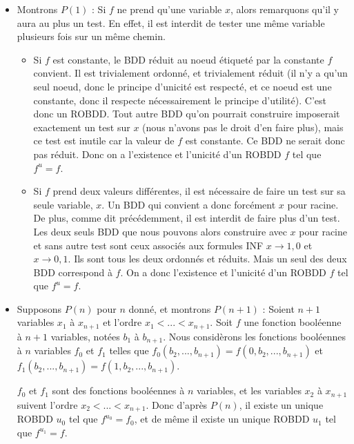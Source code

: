 \documentclass[a4paper,11pt]{article}
\begin{document}
		\begin{itemize}
		\item Montrons $P(1)$ : \newline
		Si $f$ ne prend qu'une variable $x$, alors remarquons qu'il y aura au plus un test. En effet, il est interdit de tester une même variable plusieurs fois sur un même chemin.
		\begin{itemize}
		\item Si $f$ est constante, le BDD réduit au noeud étiqueté par la constante $f$ convient. Il est trivialement ordonné, et trivialement réduit (il n'y a qu'un seul noeud, donc le principe d'unicité est respecté, et ce noeud est une constante, donc il respecte nécessairement le principe d'utilité). C'est donc un ROBDD. Tout autre BDD qu'on pourrait construire imposerait exactement un test sur $x$ (nous n'avons pas le droit d'en faire plus), mais ce test est inutile car la valeur de $f$ est constante. Ce BDD ne serait donc pas réduit. Donc on a l'existence et l'unicité d'un ROBDD $f$ tel que $f^u = f$.
		\item Si $f$ prend deux valeurs différentes, il est nécessaire de faire un test sur sa seule variable, $x$. Un BDD qui convient a donc forcément $x$ pour racine. De plus, comme dit précédemment, il est interdit de faire plus d'un test. Les deux seuls BDD que nous pouvons alors construire avec $x$ pour racine et sans autre test sont ceux associés aux formules INF $x \rightarrow 1,0$ et $x \rightarrow 0,1$. Ils sont tous les deux ordonnés et réduits. Mais un seul des deux BDD correspond à $f$. On a donc l'existence et l'unicité d'un ROBDD $f$ tel que $f^u = f$.
		\end{itemize}
		\item Supposons $P(n)$ pour $n$ donné, et montrons $P(n+1)$ :
		Soient $n+1$ variables $x_1$ à $x_{n+1}$ et l'ordre $x_1 < ... < x_{n+1}$.
		Soit $f$ une fonction booléenne à $n+1$ variables, notées $b_1$ à $b_{n+1}$. Nous considèrons les fonctions booléennes à $n$ variables $f_0$ et $f_1$ telles que $f_0(b_2,...,b_{n+1}) = f(0,b_2,...,b_{n+1})$ et $f_1(b_2,...,b_{n+1}) = f(1,b_2,...,b_{n+1})$.\newline
		
		$f_0$ et $f_1$ sont des fonctions booléennes à $n$ variables, et  les variables $x_2$ à $x_{n+1}$ suivent l'ordre $x_2 < ... <  x_{n+1}$. Donc d'après $P(n)$, il existe un unique ROBDD $u_0$ tel que $f^{u_0} = f_0$, et de même il existe un unique ROBDD $u_1$ tel que $f^{u_1} = f$.\newline


\end{itemize}
\end{document}
